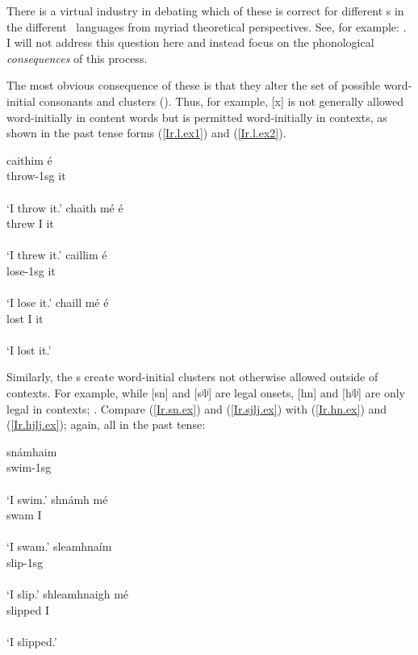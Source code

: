 \documentclass[output=paper,colorlinks,citecolor=brown]{langscibook}
\begin{document}
There is a virtual industry in debating which of these is correct for different \m s in the different \ce\ languages from myriad theoretical perspectives. See, for example:
\citet{hamp,
rogers,
fula,
lieber,
ballmuller,
kibre,
pyatt,
stewart,
green,
hannahs.mut,
hannahs.book}.
I will not address this question here and instead focus on the phonological \emph{consequences} of this process.

The most obvious consequence of these is that they alter the set of possible word-initial consonants and clusters (\cite{grijzenhout, irish.syl}). Thus, for example, [x] is not generally allowed word-initially in content words but is permitted word-initially in  contexts, as shown in the past tense forms (\ref{Ir.l.ex1}) and (\ref{Ir.l.ex2}).


\ea\label{Ir.nl.ex1}
\gll caithim   \'e \\
     throw-1sg  it \\
\glt [kaim eː] \\ `I throw it.'
\ex\label{Ir.l.ex1}
\gll chaith  m\'e  \'e \\
     threw   I     it \\
\glt [xa(j) meː eː] \\
     `I threw it.'
\ex\label{Ir.nl.ex2}
\gll caillim   \'e \\
     lose-1sg it \\
\glt [kalʲim eː] \\
     `I lose it.'
\ex\label{Ir.l.ex2}
\gll chaill m\'e  \'e \\
     lost   I     it \\
 \\
     `I lost it.'
\z

Similarly, the \m s create word-initial clusters not otherwise allowed outside of \m{} contexts. For example, while [sn] and [sʲlʲ] are  legal onsets, [hn] and [hʲlʲ] are only legal in  contexts; . Compare (\ref{Ir.sn.ex}) and (\ref{Ir.sjlj.ex}) with (\ref{Ir.hn.ex}) and (\ref{Ir.hjlj.ex}); again, all in the past tense:

\ea\label{Ir.sn.ex}
\gll sn\'amhaim \\
     swim-1sg \\
\glt [snaːwim] \\
     `I swim.'
\ex\label{Ir.hn.ex}
\gll shn\'amh m\'e \\
     swam     I \\
 \\
     `I swam.'
\ex\label{Ir.sjlj.ex}
\gll sleamhna\'im \\
     slip-1sg \\
\glt [sʲlʲawniːm] \\
     `I slip.'
\ex\label{Ir.hjlj.ex}
\gll shleamhnaigh m\'e \\
     slipped      I \\
 \\
     `I slipped.'
\z
\end{document}
